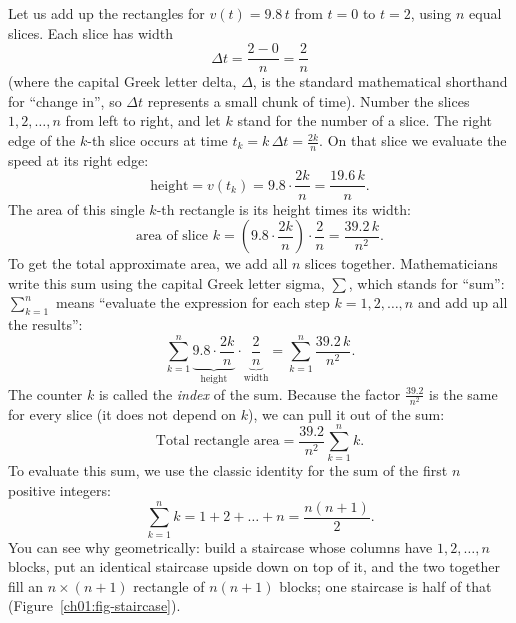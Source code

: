 Let us add up the rectangles for $v(t) = 9.8\,t$ from $t = 0$ to $t = 2$, using
$n$ equal slices. Each slice has width
\[
  \Delta t = \frac{2 - 0}{n} = \frac{2}{n}
\]
(where the capital Greek letter delta, $\Delta$, is the standard mathematical shorthand
for ``change in'', so $\Delta t$ represents a small chunk of time).
Number the slices $1, 2, \dots, n$ from left to right, and let $k$ stand for the
number of a slice. The right edge of the $k$-th slice occurs at time $t_k = k\,\Delta t = \frac{2k}{n}$.
On that slice we evaluate the speed at its right edge:
\[
  \text{height} = v(t_k) = 9.8 \cdot \frac{2k}{n} = \frac{19.6\,k}{n}.
\]
The area of this single $k$-th rectangle is its height times its width:
\[
  \text{area of slice } k = \left(9.8 \cdot \frac{2k}{n}\right) \cdot \frac{2}{n}
  = \frac{39.2\,k}{n^2}.
\]
To get the total approximate area, we add all $n$ slices together. Mathematicians
write this sum using the capital Greek letter sigma, $\sum$, which stands for ``sum'':
$\sum_{k=1}^{n}$ means ``evaluate the expression for each step $k = 1, 2, \dots, n$
and add up all the results'':
\[
  \sum_{k=1}^{n} \underbrace{9.8 \cdot \frac{2k}{n}}_{\text{height}}
  \cdot \underbrace{\frac{2}{n}}_{\text{width}}
  = \sum_{k=1}^{n} \frac{39.2\,k}{n^2}.
\]
The counter $k$ is called the \emph{index} of the sum. Because the factor
$\frac{39.2}{n^2}$ is the same for every slice (it does not depend on $k$), we can
pull it out of the sum:
\[
  \text{Total rectangle area} = \frac{39.2}{n^2}\sum_{k=1}^{n} k.
\]
To evaluate this sum, we use the classic identity for the sum of the first $n$ positive integers:
\[
  \sum_{k=1}^n k = 1 + 2 + \dots + n = \frac{n(n+1)}{2}.
\]
You can see why geometrically: build a staircase whose columns have $1, 2, \dots, n$
blocks, put an identical staircase upside down on top of it, and the two together fill
an $n \times (n+1)$ rectangle of $n(n+1)$ blocks; one staircase is half of that
(Figure~\ref{ch01:fig-staircase}).

